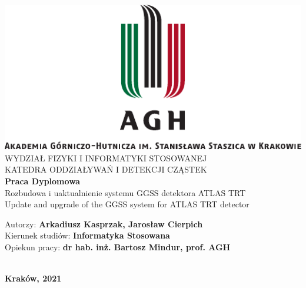 \documentclass[11pt]{aghdpl}
\begin{document}

\thispagestyle{empty}
\begin{center}
\includegraphics[scale=1.4]{res/agh_nzw_s_pl_1w_wbr_cmyk.pdf} \\[0.2cm]

WYDZIAŁ FIZYKI I INFORMATYKI STOSOWANEJ \\[0.2cm]
KATEDRA ODDZIAŁYWAŃ I DETEKCJI CZĄSTEK \\[1.2cm]
\textbf{\huge Praca Dyplomowa} \\[1.2cm]



{\LARGE Rozbudowa i uaktualnienie systemu GGSS detektora ATLAS TRT}\\[0.8cm]
{\LARGE Update and upgrade of the GGSS system for ATLAS TRT detector}\\

\vfill

\begin{minipage}{\textwidth}
\begin{flushleft}
{
    \large 
    Autorzy: \hfill \textbf{Arkadiusz Kasprzak, Jarosław Cierpich} \\[0.1cm]
    Kierunek studiów: \hfill \textbf{Informatyka Stosowana} \\[0.1cm]
    Opiekun pracy: \hfill \textbf{dr hab. inż. Bartosz Mindur, prof. AGH} \\[0.1cm]
}
\end{flushleft}
\end{minipage} \\[2cm]


{\large \bf \textsf{Kraków, 2021}}
\end{center}
\end{document}
